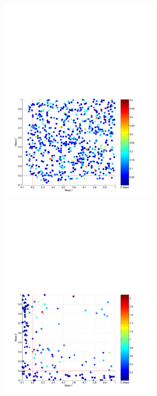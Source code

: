 \begin{figure}[p]
\begin{center}
\includegraphics[width=0.7\textwidth]{figures/result/m1m2_found}\\
\includegraphics[width=0.7\textwidth]{figures/result/m1m2_missed}
\end{center}
\caption[Injections Detected and Missed by Monte Carlo Simulation]{%
}
\end{figure}
